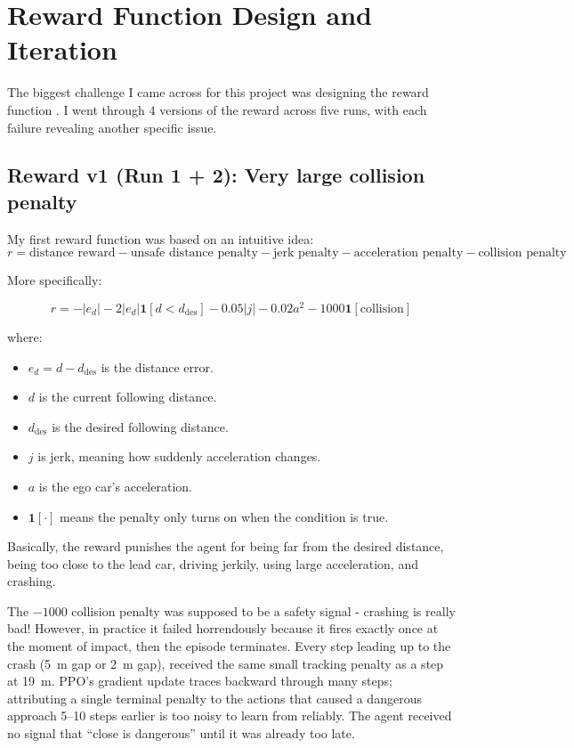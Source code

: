 \documentclass{article}
\begin{document}
\section{Reward Function Design and Iteration}

The biggest challenge I came across for this project was designing the reward function . I went through 4 versions of the reward across five runs, with each failure revealing another specific issue. 

\subsection*{Reward v1 (Run 1 + 2): Very large collision penalty}
My first reward function was based on an intuitive idea:
\[
r =
\text{distance reward}
-
\text{unsafe distance penalty}
-
\text{jerk penalty}
-
\text{acceleration penalty}
-
\text{collision penalty}
\]

More specifically:

\[
r
=
-|e_d|
-
2|e_d|\mathbf{1}[d < d_{\text{des}}]
-
0.05|j|
-
0.02a^2
-
1000\mathbf{1}[\text{collision}]
\]

where:
\begin{itemize}
    \item $e_d = d - d_{\text{des}}$ is the distance error.
    \item $d$ is the current following distance.
    \item $d_{\text{des}}$ is the desired following distance.
    \item $j$ is jerk, meaning how suddenly acceleration changes.
    \item $a$ is the ego car's acceleration.
    \item $\mathbf{1}[\cdot]$ means the penalty only turns on when the condition is true.
\end{itemize}

Basically, the reward punishes the agent for being far from the desired distance, being too close to the lead car, driving jerkily, using large acceleration, and crashing.

The $-1000$ collision penalty was supposed to be a safety signal - crashing is really bad! However, in practice it failed horrendously because it fires exactly once at the moment of impact, then the episode terminates. Every step leading up to the crash (\SI{5}{m} gap or \SI{2}{m} gap), received the same small tracking penalty as a step at \SI{19}{m}. PPO's gradient update traces backward through many steps; attributing a single terminal penalty to the actions that caused a dangerous approach 5--10 steps earlier is too noisy to learn from reliably. The agent received no signal that ``close is dangerous'' until it was already too late.
\end{document}

